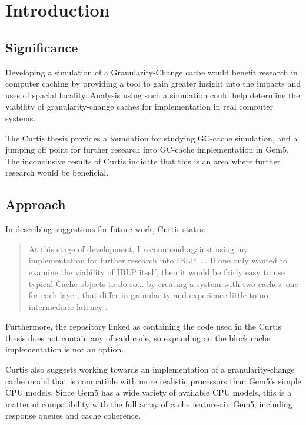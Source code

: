 \documentclass[12pt,twoside]{reedthesis}
\begin{document}
	\vfill

\chapter{Introduction}

\section{Significance}

Developing a simulation of a Granularity-Change cache would benefit research in computer caching by providing a tool to gain greater insight into the impacts and uses of spacial locality. Analysis using such a simulation could help determine the viability of granularity-change caches for implementation in real computer systems.

The Curtis thesis provides a foundation for studying GC-cache simulation, and a jumping off point for further research into GC-cache implementation in Gem5. The inconclusive results of Curtis indicate that this is an area where further research would be beneficial.

\section{Approach}

	In describing suggestions for future work, Curtis states: \begin{quote}
		At this stage of development, I recommend against using my implementation for further research into IBLP. ... If one only wanted to examine the viability of IBLP itself, then it would be fairly easy to use typical Cache objects to do so... by creating a system with two caches, one for each layer, that differ in granularity and experience little to no intermediate latency \cite{curtis}.
	\end{quote}

	Furthermore, the repository linked as containing the code used in the Curtis thesis does not contain any of said code, so expanding on the block cache implementation is not an option.

	Curtis also suggests working towards an implementation of a granularity-change cache model that is compatible with more realistic processors than Gem5's simple CPU models. Since Gem5 has a wide variety of available CPU models, this is a matter of compatibility with the full array of cache features in Gem5, including response queues and cache coherence.
\end{document}
